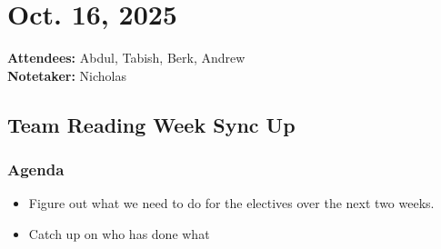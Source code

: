 	\pagebreak
	\section*{Oct. 16, 2025}

	\textbf{Attendees:} Abdul, Tabish, Berk, Andrew \\
	\textbf{Notetaker:} Nicholas

\subsection*{Team Reading Week Sync Up}
	\subsubsection*{Agenda}
		\begin{itemize}
			\item Figure out what we need to do for the electives over the next two weeks.
			\item Catch up on who has done what
		\end{itemize}

